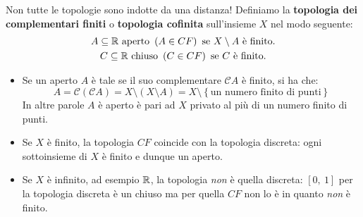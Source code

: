 \begin{attention}
	Non tutte le topologie sono indotte da una distanza! Definiamo la \textbf{topologia dei complementari finiti} o \textbf{topologia cofinita} sull'insieme $X$ nel modo seguente:
	\begin{gather*}
		A\subseteq \mathbb{R} \text{ aperto } \left(A\in CF\right) \text{ se }  X\setminus A \text{ è finito.}\\
		C\subseteq \mathbb{R} \text{ chiuso } \left(C\in CF\right) \text{ se }  C \text{ è finito.}
	\end{gather*}
	\begin{itemize}
		\item Se un aperto $A$ è tale se il suo complementare $\mathcal{C}A$ è finito, si ha che:
		\begin{equation}
			A=\mathcal{C}\left(\mathcal{C}A\right)=X\setminus\left(X\setminus A\right)=X\setminus\left\{\text{un numero finito di punti}\right\}
		\end{equation}
		In altre parole $A$ è aperto è pari ad $X$ privato al più di un numero finito di punti.
		\item Se $X$ è finito, la topologia $CF$ coincide con la topologia discreta: ogni sottoinsieme di $X$ è finito e dunque un aperto.
		\item Se $X$ è infinito, ad esempio $\mathbb{R}$, la topologia \textit{non} è quella discreta: $[0,\ 1]$ per la topologia discreta è un chiuso ma per quella $CF$ non lo è in quanto \textit{non} è finito.
	\end{itemize}
\vspace{-3mm}
\end{attention}

